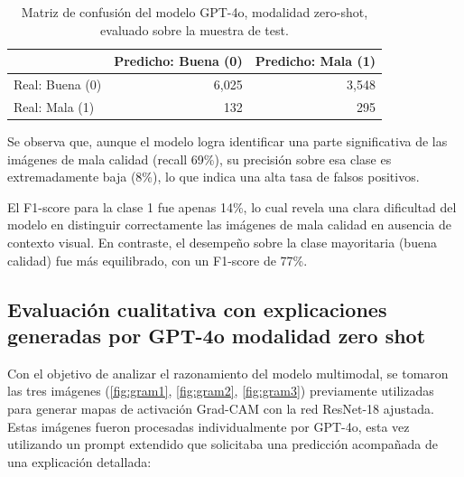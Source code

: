 \begin{table}[H]
	\centering
	\renewcommand{\arraystretch}{1.5}
	\begin{tabular}{ ||lrr||  }
		\hline
		& \textbf{Predicho: Buena (0)} & \textbf{Predicho: Mala (1)} \\
		\hline
		Real: Buena (0) & 6,025 & 3,548 \\
		\hline
		Real: Mala (1) & 132  & 295 \\
		\hline
	\end{tabular}
	\caption{Matriz de confusión del modelo GPT-4o, modalidad zero-shot, evaluado sobre la muestra de test.}
	\label{tab:matrizZeroShot}
\end{table}

Se observa que, aunque el modelo logra identificar una parte significativa de las imágenes de mala calidad (recall 69\%), su precisión sobre esa clase es extremadamente baja (8\%), lo que indica una alta tasa de falsos positivos.

El F1-score para la clase 1 fue apenas 14\%, lo cual revela una clara dificultad del modelo en distinguir correctamente las imágenes de mala calidad en ausencia de contexto visual. En contraste, el desempeño sobre la clase mayoritaria (buena calidad) fue más equilibrado, con un F1-score de 77\%.

\subsection{Evaluación cualitativa con explicaciones generadas por GPT-4o modalidad zero shot}
Con el objetivo de analizar el razonamiento del modelo multimodal, se tomaron las tres imágenes (\ref{fig:gram1}, \ref{fig:gram2}, \ref{fig:gram3}) previamente utilizadas para generar mapas de activación Grad-CAM con la red ResNet-18 ajustada. Estas imágenes fueron procesadas individualmente por GPT-4o, esta vez utilizando un prompt extendido que solicitaba una predicción acompañada de una explicación detallada:

